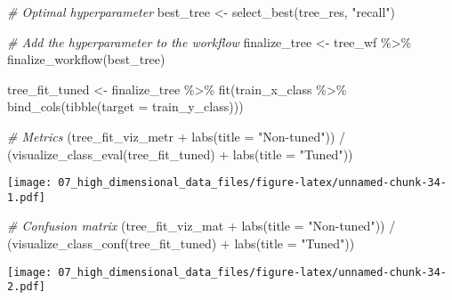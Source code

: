 \documentclass[
]{book}
\newenvironment{Shaded}{\begin{snugshade}}{\end{snugshade}}
\newcommand{\AttributeTok}[1]{\textcolor[rgb]{0.77,0.63,0.00}{#1}}
\newcommand{\CommentTok}[1]{\textcolor[rgb]{0.56,0.35,0.01}{\textit{#1}}}
\newcommand{\FunctionTok}[1]{\textcolor[rgb]{0.00,0.00,0.00}{#1}}
\newcommand{\NormalTok}[1]{#1}
\newcommand{\OtherTok}[1]{\textcolor[rgb]{0.56,0.35,0.01}{#1}}
\newcommand{\SpecialCharTok}[1]{\textcolor[rgb]{0.00,0.00,0.00}{#1}}
\newcommand{\StringTok}[1]{\textcolor[rgb]{0.31,0.60,0.02}{#1}}
\begin{document}
\begin{Shaded}
\begin{Highlighting}[]
\CommentTok{\# Optimal hyperparameter}
\NormalTok{best\_tree }\OtherTok{\textless{}{-}} \FunctionTok{select\_best}\NormalTok{(tree\_res, }\StringTok{"recall"}\NormalTok{)}

\CommentTok{\# Add the hyperparameter to the workflow }
\NormalTok{finalize\_tree }\OtherTok{\textless{}{-}}\NormalTok{ tree\_wf }\SpecialCharTok{\%\textgreater{}\%}
  \FunctionTok{finalize\_workflow}\NormalTok{(best\_tree)}
\end{Highlighting}
\end{Shaded}

\begin{Shaded}
\begin{Highlighting}[]
\NormalTok{tree\_fit\_tuned }\OtherTok{\textless{}{-}}\NormalTok{ finalize\_tree }\SpecialCharTok{\%\textgreater{}\%} 
  \FunctionTok{fit}\NormalTok{(train\_x\_class }\SpecialCharTok{\%\textgreater{}\%} \FunctionTok{bind\_cols}\NormalTok{(}\FunctionTok{tibble}\NormalTok{(}\AttributeTok{target =}\NormalTok{ train\_y\_class)))}

\CommentTok{\# Metrics }
\NormalTok{(tree\_fit\_viz\_metr }\SpecialCharTok{+} \FunctionTok{labs}\NormalTok{(}\AttributeTok{title =} \StringTok{"Non{-}tuned"}\NormalTok{)) }\SpecialCharTok{/}\NormalTok{ (}\FunctionTok{visualize\_class\_eval}\NormalTok{(tree\_fit\_tuned) }\SpecialCharTok{+} \FunctionTok{labs}\NormalTok{(}\AttributeTok{title =} \StringTok{"Tuned"}\NormalTok{))}
\end{Highlighting}
\end{Shaded}

\texttt{[image: 07\_high\_dimensional\_data\_files/figure-latex/unnamed-chunk-34-1.pdf]}

\begin{Shaded}
\begin{Highlighting}[]
\CommentTok{\# Confusion matrix }
\NormalTok{(tree\_fit\_viz\_mat }\SpecialCharTok{+} \FunctionTok{labs}\NormalTok{(}\AttributeTok{title =} \StringTok{"Non{-}tuned"}\NormalTok{)) }\SpecialCharTok{/}\NormalTok{ (}\FunctionTok{visualize\_class\_conf}\NormalTok{(tree\_fit\_tuned) }\SpecialCharTok{+} \FunctionTok{labs}\NormalTok{(}\AttributeTok{title =} \StringTok{"Tuned"}\NormalTok{))}
\end{Highlighting}
\end{Shaded}

\texttt{[image: 07\_high\_dimensional\_data\_files/figure-latex/unnamed-chunk-34-2.pdf]}
\end{document}
